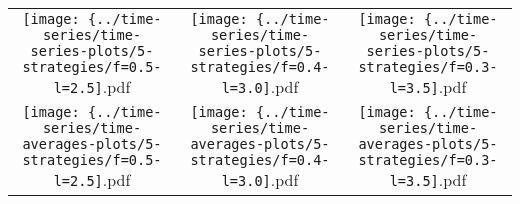 \documentclass{standalone}
\begin{document}
\begin{tabular}{ccc}
\texttt{[image: \{../time-series/time-series-plots/5-strategies/f=0.5-l=2.5]}.pdf}&
\texttt{[image: \{../time-series/time-series-plots/5-strategies/f=0.4-l=3.0]}.pdf}&
\texttt{[image: \{../time-series/time-series-plots/5-strategies/f=0.3-l=3.5]}.pdf}\\
\texttt{[image: \{../time-series/time-averages-plots/5-strategies/f=0.5-l=2.5]}.pdf}&
\texttt{[image: \{../time-series/time-averages-plots/5-strategies/f=0.4-l=3.0]}.pdf}&
\texttt{[image: \{../time-series/time-averages-plots/5-strategies/f=0.3-l=3.5]}.pdf}\\

\end{tabular}
\end{document}
